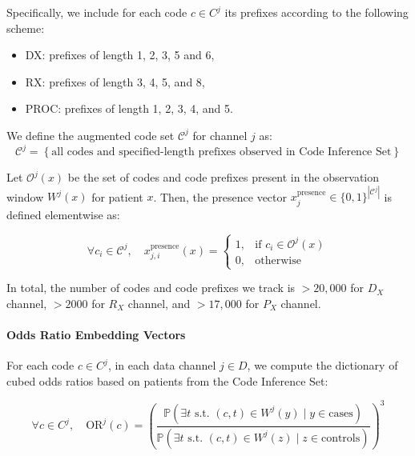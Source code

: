 Specifically, we include for each code $c \in C^j$ its prefixes according to the following scheme:
\begin{itemize}
    \item DX: prefixes of length 1, 2, 3, 5 and 6,
    \item RX: prefixes of length 3, 4, 5, and 8,
    \item PROC: prefixes of length 1, 2, 3, 4, and 5.
\end{itemize}

We define the augmented code set $\mathcal{C}^j$ for channel $j$ as:
\[
\mathcal{C}^j = \left\{ \text{all codes and specified-length prefixes observed in Code Inference Set} \right\}
\]

Let $\mathcal{O}^j(x)$ be the set of codes and code prefixes present in the observation window $W^j(x)$ for patient $x$. Then, the presence vector $x^{\text{presence}}_j \in \{0, 1\}^{|\mathcal{C}^j|}$ is defined elementwise as:

\begin{equation}
\forall c_i \in \mathcal{C}^j, \quad x^{\text{presence}}_{j,i}(x) =
\begin{cases}
1, & \text{if } c_i \in \mathcal{O}^j(x) \\
0, & \text{otherwise}
\end{cases}
\end{equation}

In total, the number of codes and code prefixes we track is $>20,000$ for $D_X$ channel, $>2000$ for $R_X$ channel, and $>17,000$ for $P_X$ channel. 

\paragraph*{Odds Ratio Embedding Vectors}

For each code $c \in C^j$, in each data channel $j \in D$, we compute the dictionary of cubed odds ratios based on patients from the Code Inference Set:

\begin{equation}
\forall c \in C^j, \quad \text{OR}^j(c) = \left( \frac{\mathbb{P}(\exists t \text{ s.t. } (c, t) \in W^j(y) \mid y \in \text{cases})}{\mathbb{P}(\exists t \text{ s.t. } (c, t) \in W^j(z) \mid z \in \text{controls})} \right)^3
\end{equation}

